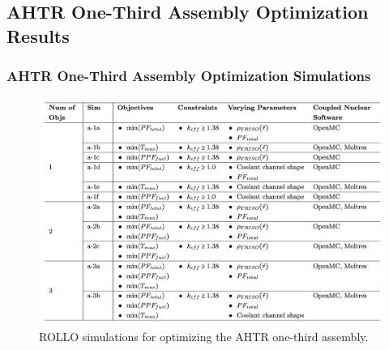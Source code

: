 
\subsection{AHTR One-Third Assembly Optimization Results}
\begin{frame}
    \frametitle{AHTR One-Third Assembly Optimization Simulations}
    \begin{figure}
        \includegraphics[width=0.9\linewidth]{figures/ahtr-assem-opt-table.png} 
        \caption{ROLLO simulations for optimizing the AHTR one-third assembly.}
    \end{figure}
\end{frame}

